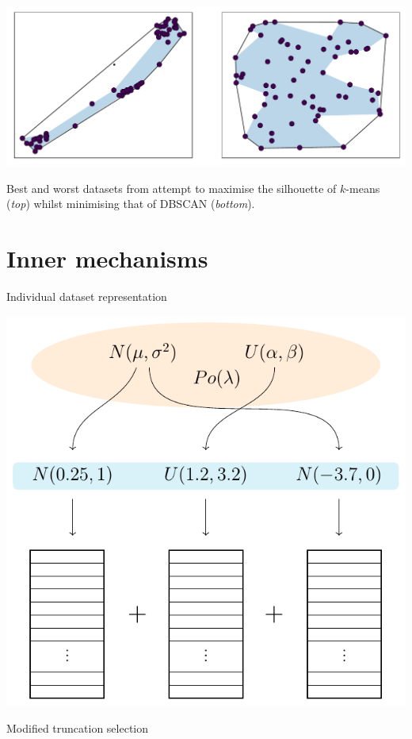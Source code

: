 \documentclass{betterposter}
\begin{document}
{\begin{center}
\begin{minipage}{.8\linewidth}
        \includegraphics[width=\linewidth]{img/dbscan.pdf}
    \end{minipage}
\end{center}

\textcolor{mygrey}{%
    Best and worst datasets from attempt to maximise the silhouette of
    \(k\)-means (\textit{top}) whilst minimising that of DBSCAN
    (\textit{bottom}).
}

}{%


\vspace{-3em}\section{Inner mechanisms}
\fontsize{36}{50}\selectfont
Individual dataset representation

\vspace{.5ex}\begin{center}
    \includegraphics[width=.65\linewidth]{tex/individual.pdf}
\end{center}

Modified truncation selection

}
\end{document}
